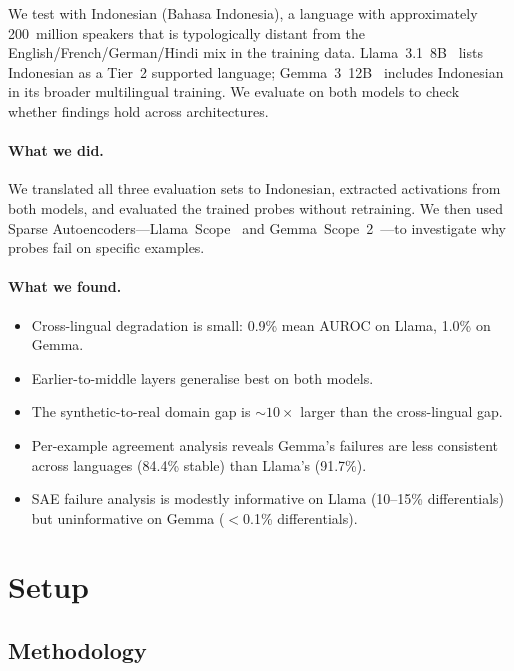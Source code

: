 \documentclass{article}
\newcommand{\auroc}{AUROC\xspace}
\newcommand{\llama}{Llama~3.1~8B\xspace}
\newcommand{\gemma}{Gemma~3~12B\xspace}
\begin{document}
We test with Indonesian (Bahasa Indonesia), a language with approximately
200~million speakers that is typologically distant from the
English/French/German/Hindi mix in the training data.
\llama~\cite{llama3} lists Indonesian as a Tier~2 supported language;
\gemma~\cite{gemma3} includes Indonesian in its broader multilingual training.
We evaluate on both models to check whether findings hold across architectures.

\paragraph{What we did.}
We translated all three evaluation sets to Indonesian, extracted activations
from both models, and evaluated the trained probes without retraining.
We then used Sparse Autoencoders---Llama~Scope~\cite{llamascope} and
Gemma~Scope~2~\cite{gemma_scope2}---to investigate why probes fail on specific
examples.

\paragraph{What we found.}
\begin{itemize}[nosep]
  \item Cross-lingual degradation is small: 0.9\% mean \auroc on Llama,
        1.0\% on Gemma.
  \item Earlier-to-middle layers generalise best on both models.
  \item The synthetic-to-real domain gap is ${\sim}10\times$ larger than the
        cross-lingual gap.
  \item Per-example agreement analysis reveals Gemma's failures are less
        consistent across languages (84.4\% stable) than Llama's (91.7\%).
  \item SAE failure analysis is modestly informative on Llama (10--15\%
        differentials) but uninformative on Gemma (${<}$0.1\% differentials).
\end{itemize}

\section{Setup}
\label{sec:setup}

\subsection{Methodology}
\label{sec:methodology}
\end{document}
